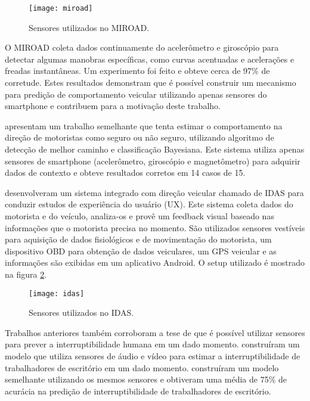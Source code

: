 \begin{figure}[h]
\centering
\texttt{[image: miroad]}
\caption{Sensores utilizados no MIROAD. \cite{johnson2011driving}}
\label{miroad}
\end{figure}

O MIROAD coleta dados continuamente do acelerômetro e giroscópio para detectar algumas manobras específicas, como curvas acentuadas
e acelerações e freadas instantâneas.
Um experimento foi feito e obteve cerca de 97\% de corretude. Estes resultados demonstram que é possível construir
um mecanismo para predição de comportamento veicular utilizando apenas sensores do smartphone e contribuem para a motivação deste trabalho.

 apresentam um trabalho semelhante que tenta estimar o comportamento na direção de motoristas como seguro ou
não seguro, utilizando algoritmo de detecção de melhor caminho e classificação Bayesiana. Este sistema utiliza
apenas sensores de smartphone (acelerômetro, giroscópio e magnetômetro) para adquirir dados de contexto e obteve
resultados corretos em 14 casos de 15.

 desenvolveram um sistema integrado com direção veicular chamado de IDAS para conduzir estudos de experiência
do usuário (UX). Este sistema coleta dados do motorista e do veículo, analiza-os e provê um feedback visual baseado
nas informações que o motorista precisa no momento. São utilizados sensores vestíveis para aquisição de dados
fisiológicos e de movimentação do motorista, um dispositivo OBD para obtenção de dados veiculares, um GPS veicular e as informações
são exibidas em um aplicativo Android. O setup utilizado é mostrado na figura \ref{idas}.

\begin{figure}[htb]
\centering
\texttt{[image: idas]}
\caption{Sensores utilizados no IDAS. \cite{park2016integrated}}
\label{idas}
\end{figure}

Trabalhos anteriores também corroboram a tese de que é possível utilizar sensores para prever a interruptibilidade
humana em um dado momento.  construíram um modelo que utiliza sensores de áudio e vídeo
para estimar a interruptibilidade de trabalhadores de escritório em um dado momento. 
construíram um modelo semelhante utilizando os mesmos sensores e obtiveram uma média de 75\% de acurácia na predição de
interruptibilidade de trabalhadores de escritório.
